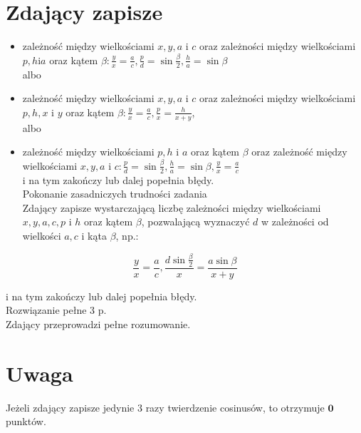 \documentclass[10pt]{article}
\begin{document}
\section*{Zdający zapisze}
\begin{itemize}
  \item zależność między wielkościami $x, y, a$ i $c$ oraz zależności między wielkościami $p, h \mathrm{i} a$ oraz kątem $\beta: \frac{y}{x}=\frac{a}{c}, \frac{p}{d}=\sin \frac{\beta}{2}, \frac{h}{a}=\sin \beta$\\
albo
  \item zależność między wielkościami $x, y, a$ i $c$ oraz zależności między wielkościami $p, h, x$ i $y$ oraz kątem $\beta: \frac{y}{x}=\frac{a}{c}, \frac{p}{x}=\frac{h}{x+y}$,\\
albo
  \item zależność między wielkościami $p, h$ i $a$ oraz kątem $\beta$ oraz zależność między wielkościami $x, y, a$ i $c: \frac{p}{d}=\sin \frac{\beta}{2}, \frac{h}{a}=\sin \beta, \frac{y}{x}=\frac{a}{c}$\\
i na tym zakończy lub dalej popełnia błędy.\\
Pokonanie zasadniczych trudności zadania\\
Zdający zapisze wystarczającą liczbę zależności między wielkościami $x, y, a, c, p$ i $h$ oraz kątem $\beta$, pozwalającą wyznaczyć $d$ w zależności od wielkości $a, c$ i kąta $\beta$, np.:
\end{itemize}

$$
\frac{y}{x}=\frac{a}{c}, \frac{d \sin \frac{\beta}{2}}{x}=\frac{a \sin \beta}{x+y}
$$

i na tym zakończy lub dalej popełnia błędy.\\
Rozwiązanie pełne 3 p.\\
Zdający przeprowadzi pełne rozumowanie.

\section*{Uwaga}
Jeżeli zdający zapisze jedynie 3 razy twierdzenie cosinusów, to otrzymuje $\mathbf{0}$ punktów.
\end{document}
